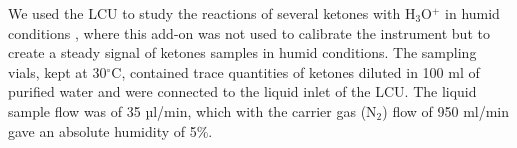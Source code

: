 We used the LCU to study the reactions of several ketones with H$_3$O$^+$ in humid conditions \cite{malaskova2019compendium}, where this add-on was not used to calibrate the instrument but to create a steady signal of ketones samples in humid conditions. %
%
The sampling vials, kept at 30$^{\circ}$C, contained  trace quantities of  ketones  diluted in 100 ml of purified water and were  connected to the liquid inlet of the LCU. The liquid sample flow was of 35 µl/min, which with the carrier gas (N$_2$) flow of 950 ml/min gave an absolute humidity of 5\%.
%








